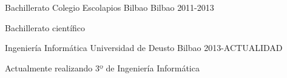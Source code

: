 


\begin{cventries}


\cventry
{Bachillerato} %
{Colegio Escolapios Bilbao} %
{Bilbao} %
{2011-2013} %
{ %
\begin{cvitems}
\item {Bachillerato científico }
\end{cvitems}
}

\cventry
{Ingeniería Informática} %
{Universidad de Deusto} %
{Bilbao} %
{2013-ACTUALIDAD} %
{ %
\begin{cvitems}
\item {Actualmente realizando 3º de Ingeniería Informática}
\end{cvitems}
}


\end{cventries}